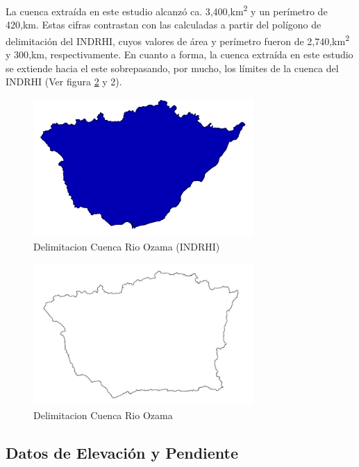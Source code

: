 \documentclass[11pt,]{article}
\begin{document}
La cuenca extraída en este estudio alcanzó ca.
3,400,km\textsuperscript{2} y un perímetro de 420,km. Estas cifras
contrastan con las calculadas a partir del polígono de delimitación del
INDRHI, cuyos valores de área y perímetro fueron de
2,740,km\textsuperscript{2} y 300,km, respectivamente. En cuanto a
forma, la cuenca extraída en este estudio se extiende hacia el este
sobrepasando, por mucho, los límites de la cuenca del INDRHI (Ver figura
\ref{fig:delimitacioncuencaindrhi} y 2).

\begin{figure}
\centering
\includegraphics[width=0.75000\textwidth]{Productos Generados/Cuenca_forma1.jpeg}
\caption{\label{fig:delimitacioncuencaindrhi}Delimitacion Cuenca Rio
Ozama (INDRHI)}
\end{figure}

\begin{figure}
\centering
\includegraphics[width=0.75000\textwidth]{Productos Generados/Cuenca_p_forma1.jpeg}
\caption{\label{fig:delimitacioncuencaindrhi}Delimitacion Cuenca Rio
Ozama}
\end{figure}

\subsection{Datos de Elevación y
Pendiente}\label{datos-de-elevaciuxf3n-y-pendiente}
\end{document}
